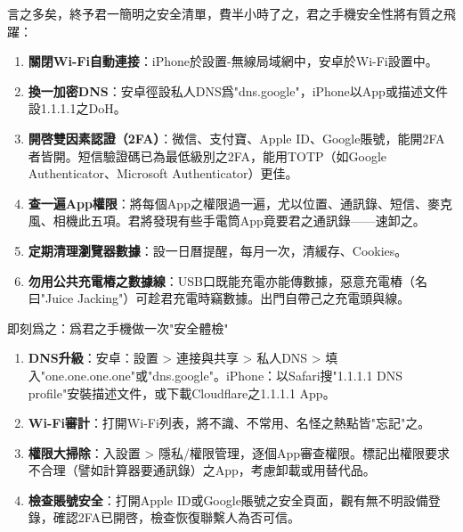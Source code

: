 
言之多矣，終予君一簡明之安全清單，費半小時了之，君之手機安全性將有質之飛躍：

\begin{enumerate}
  \item \textbf{關閉Wi-Fi自動連接}：iPhone於設置-無線局域網中，安卓於Wi-Fi設置中。
  \item \textbf{換一加密DNS}：安卓徑設私人DNS爲"dns.google"，iPhone以App或描述文件設1.1.1.1之DoH。
  \item \textbf{開啓雙因素認證（2FA）}：微信、支付寶、Apple ID、Google賬號，能開2FA者皆開。短信驗證碼已為最低級別之2FA，能用TOTP（如Google Authenticator、Microsoft Authenticator）更佳。
  \item \textbf{查一遍App權限}：將每個App之權限過一遍，尤以位置、通訊錄、短信、麥克風、相機此五項。君將發現有些手電筒App竟要君之通訊錄——速卸之。
  \item \textbf{定期清理瀏覽器數據}：設一日曆提醒，每月一次，清緩存、Cookies。
  \item \textbf{勿用公共充電樁之數據線}：USB口既能充電亦能傳數據，惡意充電樁（名曰"Juice Jacking"）可趁君充電時竊數據。出門自帶己之充電頭與線。
\end{enumerate}

\begin{tcbpractice}{即刻爲之：爲君之手機做一次"安全體檢"}
\begin{enumerate}
  \item \textbf{DNS升級}：安卓：設置 > 連接與共享 > 私人DNS > 填入"one.one.one.one"或"dns.google"。iPhone：以Safari搜"1.1.1.1 DNS profile"安裝描述文件，或下載Cloudflare之1.1.1.1 App。
  \item \textbf{Wi-Fi審計}：打開Wi-Fi列表，將不識、不常用、名怪之熱點皆"忘記"之。
  \item \textbf{權限大掃除}：入設置 > 隱私/權限管理，逐個App審查權限。標記出權限要求不合理（譬如計算器要通訊錄）之App，考慮卸載或用替代品。
  \item \textbf{檢查賬號安全}：打開Apple ID或Google賬號之安全頁面，觀有無不明設備登錄，確認2FA已開啓，檢查恢復聯繫人為否可信。
\end{enumerate}

\end{tcbpractice}

